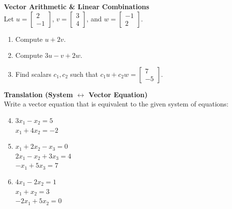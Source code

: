 \documentclass[12pt]{article}
\begin{document}
\textbf{Vector Arithmetic \& Linear Combinations} \\
Let $u = \begin{bmatrix} 2 \\ -1 \end{bmatrix}$, $v = \begin{bmatrix} 3 \\ 4 \end{bmatrix}$, and $w = \begin{bmatrix} -1 \\ 2 \end{bmatrix}$. 
\begin{enumerate}
    \item Compute $u + 2v$.
    \item Compute $3u - v + 2w$.
    \item Find scalars $c_1, c_2$ such that $c_1 u + c_2 w = \begin{bmatrix} 7 \\ -5 \end{bmatrix}$.
\end{enumerate}

\textbf{Translation (System $\leftrightarrow$ Vector Equation)} \\
Write a vector equation that is equivalent to the given system of equations:
\begin{enumerate}
\setcounter{enumi}{3}
    \item $3x_1 - x_2 = 5$ \\ $x_1 + 4x_2 = -2$
    \item $x_1 + 2x_2 - x_3 = 0$ \\ $2x_1 - x_2 + 3x_3 = 4$ \\ $-x_1 + 5x_3 = 7$
    \item $4x_1 - 2x_2 = 1$ \\ $x_1 + x_2 = 3$ \\ $-2x_1 + 5x_2 = 0$
\end{enumerate}
\end{document}
